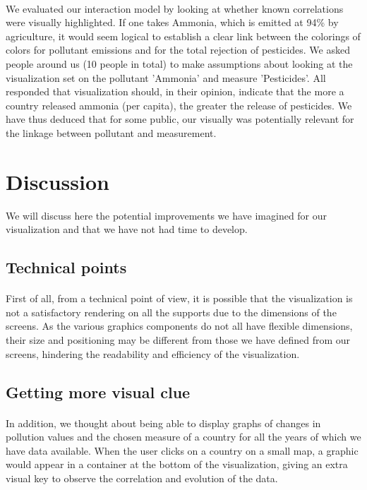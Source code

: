 \documentclass[preprint,journal]{vgtc}       %
\begin{document}
\paragraph{}
We evaluated our interaction model by looking at whether known correlations were visually highlighted.
If one takes Ammonia, which is emitted at 94\% by agriculture, it would seem logical to establish a clear link between the colorings of colors for pollutant emissions and for the total rejection of pesticides. We asked people around us (10 people in total) to make assumptions about looking at the visualization set on the pollutant 'Ammonia' and measure 'Pesticides'. All responded that visualization should, in their opinion, indicate that the more a country released ammonia (per capita), the greater the release of pesticides. We have thus deduced that for some public, our visually was potentially relevant for the linkage between pollutant and measurement.

\section{Discussion}

We will discuss here the potential improvements we have imagined for our visualization and that we have not had time to develop. 

\subsection{Technical points}

\paragraph{}
First of all, from a technical point of view, it is possible that the visualization is not a satisfactory rendering on all the supports due to the dimensions of the screens. As the various graphics components do not all have flexible dimensions, their size and positioning may be different from those we have defined from our screens, hindering the readability and efficiency of the visualization. 


\subsection{Getting more visual clue}

\paragraph{}
In addition, we thought about being able to display graphs of changes in pollution values ​​and the chosen measure of a country for all the years of which we have data available. When the user clicks on a country on a small map, a graphic would appear in a container at the bottom of the visualization, giving an extra visual key to observe the correlation and evolution of the data. 
\end{document}
